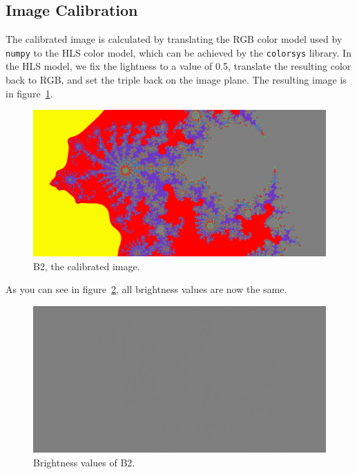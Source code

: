 \documentclass[a4paper,12pt]{article}
\begin{document}
	\subsection{Image Calibration}
	
	The calibrated image is calculated by translating the RGB color model used by \texttt{numpy} to the HLS color model, which can be achieved by the \texttt{colorsys} library. In the HLS model, we fix the lightness to a value of 0.5, translate the resulting color back to RGB, and set the triple back on the image plane. The resulting image is in figure~\ref{fig:b2}.
	
	\begin{figure}[h!]	
		\centering
		\includegraphics[width=.95\textwidth]{B2.png}
		\caption{\label{fig:b2}B2, the calibrated image.}
	\end{figure}
	
	As you can see in figure~\ref{fig:b2bright}, all brightness values are now the same.
	
	\begin{figure}[h!]	
		\centering
		\includegraphics[width=.95\textwidth]{B2_Brightness.png}
		\caption{\label{fig:b2bright}Brightness values of B2.}
	\end{figure}
\end{document}
